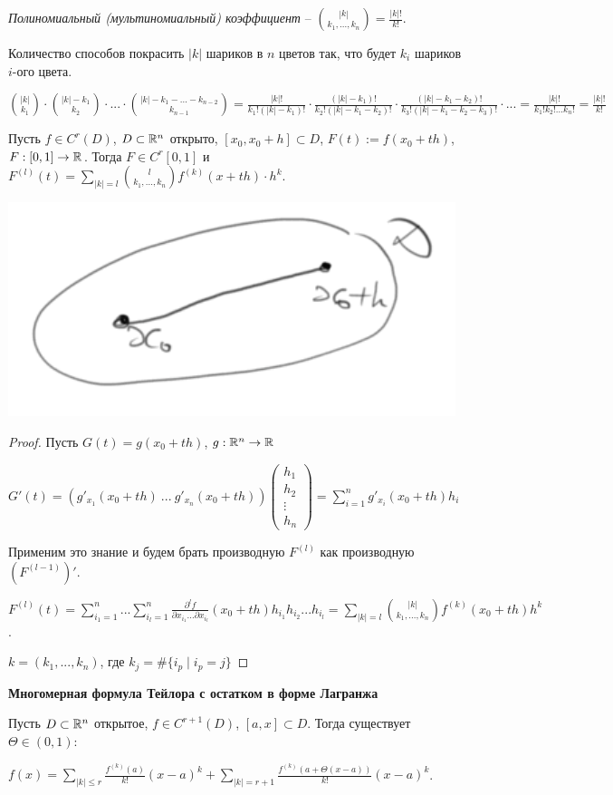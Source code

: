 \begin{definition}
    \textit{Полиномиальный (мультиномиальный) коэффициент} – $\binom{|k|}{k_1, ..., k_n}=\frac{|k|!}{k!}$. 
    
    Количество способов покрасить $|k|$ шариков в $n$ цветов так, что будет $k_i$ шариков $i$-ого цвета.

    $\binom{|k|}{k_1}\cdot \binom{|k| - k_1}{k_2}\cdot ... \cdot \binom{|k|-k_1-...-k_{n-2}}{k_{n-1}}=\frac{|k|!}{k_1!(|k|-k_1)!}\cdot \frac{(|k|-k_1)!}{k_2!(|k|-k_1-k_2)!}\cdot \frac{(|k|-k_1-k_2)!}{k_3!(|k|-k_1-k_2-k_3)!}\cdot ...=\frac{|k|!}{k_1!k_2!...k_n!}=\frac{|k|!}{k!}$
\end{definition}

\begin{lemma}
    Пусть $f\in C^r(D)$, $D\subset \mathbb{R}^n$ открыто, $[x_0, x_0 + h]\subset D$, $F(t):=f(x_0 + th)$, $F:[0, 1]\rightarrow \mathbb{R}$. Тогда $F\in C^r[0, 1]$ и $F^{(l)}(t)=\sum\limits_{|k|=l}\binom{l}{k_1, ..., k_n}f^{(k)}(x+th)\cdot h^k$.

    \includegraphics[width=0.2\linewidth]{images/24-05-2.png}
\end{lemma}

\begin{proof}
    Пусть $G(t)=g(x_0+th)$, $g: \mathbb{R}^n \rightarrow \mathbb{R}$ 
    
    $G'(t)=(g'_{x_1}(x_0+th)\ ...\ g'_{x_n}(x_0+th))\begin{pmatrix}
        h_1 \\ h_2 \\ \vdots \\ h_n 
    \end{pmatrix}=\sum\limits_{i=1}^n g'_{x_i}(x_0+th)h_i$

    Применим это знание и будем брать производную $F^{(l)}$ как производную $(F^{(l-1)})'$.

    $F^{(l)}(t)=\sum\limits_{i_1=1}^n...\sum\limits_{i_l=1}^n\frac{\partial ^l f}{\partial x_{i_1} ... \partial x_{i_l}}(x_0+th)h_{i_1}h_{i_2}...h_{i_l}=\sum\limits_{|k|=l}\binom{|k|}{k_1, ..., k_n}f^{(k)}(x_0+th)h^k$.

    $k=(k_1, ..., k_n)$, где $k_j=\#\{ i_p\mid i_p = j\}$
\end{proof}

\begin{theorem}
    \textbf{Многомерная формула Тейлора с остатком в форме Лагранжа}

    Пусть $D\subset \mathbb{R}^n$ открытое, $f\in C^{r+1}(D)$, $[a, x]\subset D$. Тогда существует $\Theta\in (0, 1)$:
    
    $f(x)=\sum\limits_{|k|\leq r}\frac{f^{(k)}(a)}{k!}(x-a)^k+\sum\limits_{|k|=r+1}\frac{f^{(k)}(a+\Theta(x-a))}{k!}(x-a)^k$.
\end{theorem}

